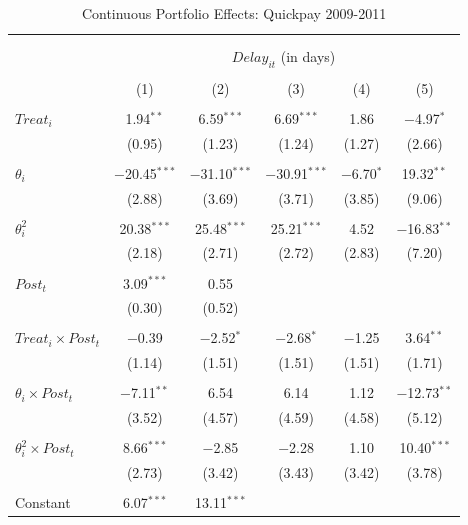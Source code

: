 \documentclass[
]{article}
\begin{document}
\begin{table}[H] \centering 
  \caption{Continuous Portfolio Effects: Quickpay 2009-2011} 
  \label{} 
\small 
\begin{tabular}{@{\extracolsep{-2pt}}lccccc} 
\\[-1.8ex]\hline 
\hline \\[-1.8ex] 
\\[-1.8ex] & \multicolumn{5}{c}{$Delay_{it}$ (in days)} \\ 
\\[-1.8ex] & (1) & (2) & (3) & (4) & (5)\\ 
\hline \\[-1.8ex] 
 $Treat_i$ & 1.94$^{**}$ & 6.59$^{***}$ & 6.69$^{***}$ & 1.86 & $-$4.97$^{*}$ \\ 
  & (0.95) & (1.23) & (1.24) & (1.27) & (2.66) \\ 
  & & & & & \\ 
 $\theta_i$ & $-$20.45$^{***}$ & $-$31.10$^{***}$ & $-$30.91$^{***}$ & $-$6.70$^{*}$ & 19.32$^{**}$ \\ 
  & (2.88) & (3.69) & (3.71) & (3.85) & (9.06) \\ 
  & & & & & \\ 
 $\theta_i^2$ & 20.38$^{***}$ & 25.48$^{***}$ & 25.21$^{***}$ & 4.52 & $-$16.83$^{**}$ \\ 
  & (2.18) & (2.71) & (2.72) & (2.83) & (7.20) \\ 
  & & & & & \\ 
 $Post_t$ & 3.09$^{***}$ & 0.55 &  &  &  \\ 
  & (0.30) & (0.52) &  &  &  \\ 
  & & & & & \\ 
 $Treat_i \times Post_t$ & $-$0.39 & $-$2.52$^{*}$ & $-$2.68$^{*}$ & $-$1.25 & 3.64$^{**}$ \\ 
  & (1.14) & (1.51) & (1.51) & (1.51) & (1.71) \\ 
  & & & & & \\ 
 $\theta_i \times Post_t$ & $-$7.11$^{**}$ & 6.54 & 6.14 & 1.12 & $-$12.73$^{**}$ \\ 
  & (3.52) & (4.57) & (4.59) & (4.58) & (5.12) \\ 
  & & & & & \\ 
 $\theta_i^2 \times Post_t$ & 8.66$^{***}$ & $-$2.85 & $-$2.28 & 1.10 & 10.40$^{***}$ \\ 
  & (2.73) & (3.42) & (3.43) & (3.42) & (3.78) \\ 
  & & & & & \\ 
 Constant & 6.07$^{***}$ & 13.11$^{***}$ &  &  &  \\ 

\end{tabular}
\end{table}
\end{document}
